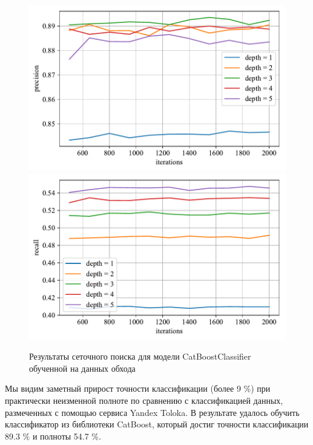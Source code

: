 \begin{figure}
    \centering
    \includegraphics{./images/model_factory_precision.pdf}
    \includegraphics{./images/model_factory_recall.pdf}
    \caption{Результаты сеточного поиска для модели CatBoostClassifier обученной на данных обхода}
    \label{fig:model_factory}
\end{figure}

Мы видим заметный прирост точности классификации (более 9 \%) при практически неизменной полноте по сравнению с классификацией данных, размеченных с помощью сервиса Yandex Toloka. В результате удалось обучить классификатор из библиотеки CatBoost, который достиг точности классификации 89.3 \% и полноты 54.7 \%.